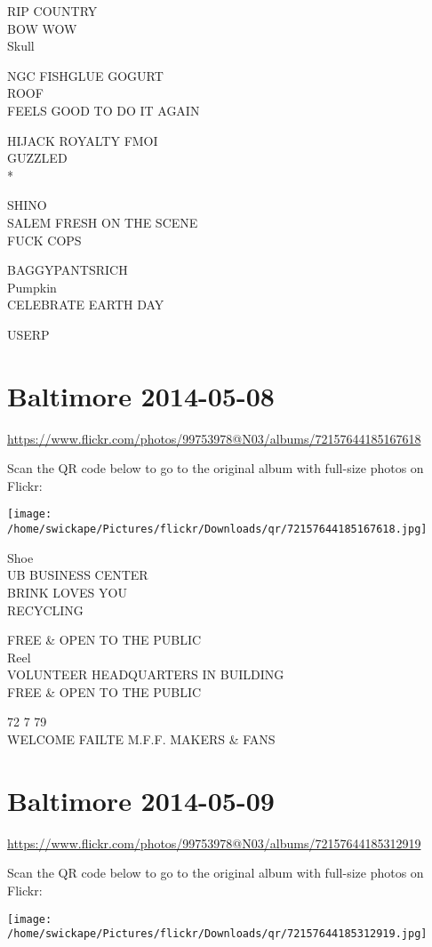 \documentclass[10pt,letterpaper]{article}
\begin{document}
RIP COUNTRY\\
BOW WOW\\
Skull

NGC FISHGLUE GOGURT\\
ROOF\\
FEELS GOOD TO DO IT AGAIN

HIJACK ROYALTY FMOI\\
GUZZLED\\
*

SHINO\\
SALEM FRESH ON THE SCENE\\
FUCK COPS

BAGGYPANTSRICH\\
Pumpkin\\
CELEBRATE EARTH DAY

USERP
\pagebreak

\section*{Baltimore 2014-05-08}

\url{https://www.flickr.com/photos/99753978@N03/albums/72157644185167618}

Scan the QR code below to go to the original album with full-size photos on Flickr:

\texttt{[image: /home/swickape/Pictures/flickr/Downloads/qr/72157644185167618.jpg]}
\pagebreak

Shoe\\
UB BUSINESS CENTER\\
BRINK LOVES YOU\\
RECYCLING

FREE \& OPEN TO THE PUBLIC\\
Reel\\
VOLUNTEER HEADQUARTERS IN BUILDING\\
FREE \& OPEN TO THE PUBLIC

72 7 79\\
WELCOME FAILTE M.F.F. MAKERS \& FANS
\pagebreak

\section*{Baltimore 2014-05-09}

\url{https://www.flickr.com/photos/99753978@N03/albums/72157644185312919}

Scan the QR code below to go to the original album with full-size photos on Flickr:

\texttt{[image: /home/swickape/Pictures/flickr/Downloads/qr/72157644185312919.jpg]}
\pagebreak
\end{document}
